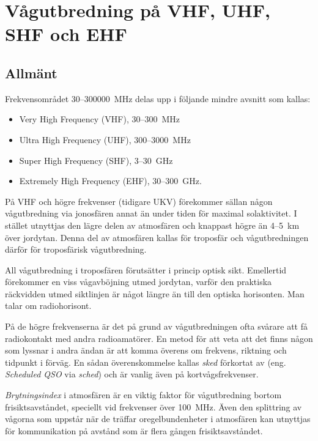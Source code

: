 \section[Vågutbredning på VHF-EHF]{Vågutbredning på VHF, UHF, SHF och EHF}

\subsection{Allmänt}
Frekvensområdet 30--300000~MHz delas upp
i följande mindre avsnitt som kallas:
\begin{itemize}
  \item Very High Frequency (VHF), 30--300~MHz
  \item Ultra High Frequency (UHF), 300--3000~MHz
  \item Super High Frequency (SHF), 3--30~GHz
  \item Extremely High Frequency (EHF), 30--300~GHz.
\end{itemize}

På VHF och högre frekvenser (tidigare UKV) förekommer sällan någon
vågutbredning via jonosfären annat än under tiden för maximal solaktivitet.
I stället utnyttjas den lägre delen av atmosfären och
knappast högre än 4--5~km över jordytan.
Denna del av atmosfären kallas för troposfär och vågutbredningen därför för
troposfärisk vågutbredning.

All vågutbredning i troposfären förutsätter i princip optisk sikt.
Emellertid förekommer en viss vågavböjning utmed jordytan, varför den praktiska
räckvidden utmed siktlinjen är något längre än till den optiska horisonten.
Man talar om radiohorisont.

På de högre frekvenserna är det på grund av vågutbredningen ofta svårare att
få radiokontakt med andra radioamatörer.
En metod för att veta att det finns någon som lyssnar i andra ändan är att komma
överens om frekvens, riktning och tidpunkt i förväg.
En sådan överenskommelse kallas \emph{sked} förkortat av
(eng. \emph{Scheduled QSO} via \emph{sched}) och är vanlig även på
kortvågsfrekvenser.
 
\emph{Brytningsindex} i atmosfären är en viktig faktor för
vågutbredning bortom frisiktsavståndet, speciellt vid frekvenser över 100~MHz.
Även den splittring av vågorna som uppstår när de träffar oregelbundenheter i
atmosfären kan utnyttjas för kommunikation på avstånd som är flera gången
frisiktsavståndet.

